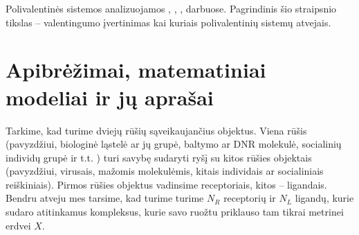 \documentclass[10pt]{article}
\begin{document}
Polivalentinės  sistemos analizuojamos  \cite{Mammen98}, \cite{Chinlin2000}, \cite{Houseman02},\cite{Klein03} darbuose. Pagrindinis šio straipsnio tikslas -- valentingumo įvertinimas kai kuriais polivalentinių sistemų atvejais.

\section{Apibrėžimai, matematiniai modeliai ir jų aprašai}


Tarkime, kad turime dviejų rūšių sąveikaujančius objektus. Viena rūšis (pavyzdžiui, biologinė ląstelė ar jų grupė, baltymo ar DNR molekulė, socialinių individų grupė ir t.t. ) turi savybę sudaryti ryšį su kitos rūšies objektais (pavyzdžiui, virusais, mažomis molekulėmis, kitais individais ar socialiniais reiškiniais). Pirmos rūšies objektus vadinsime receptoriais, kitos -- ligandais. Bendru atveju mes tarsime, kad turime turime $N_R$ receptorių ir $N_L$ ligandų, kurie sudaro atitinkamus kompleksus, kurie savo ruožtu priklauso tam tikrai metrinei erdvei $X$.   
\end{document}
